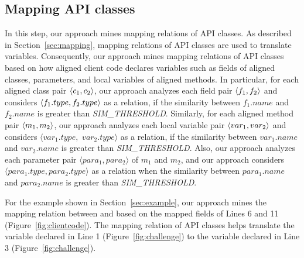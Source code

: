 \subsection{Mapping API classes}
\label{sec:approach:mappingtypes}

In this step, our approach mines mapping relations of
API classes. As described in Section~\ref{sec:mapping}, mapping relations of API classes are used
to translate variables. Consequently, our approach mines mapping
relations of API classes based on how aligned client code declares
variables such as fields of aligned classes, parameters, and local variables of aligned methods. In
particular, for each aligned class pair $\langle c_1, c_2 \rangle$, our
approach analyzes each field pair $\langle f_1, f_2 \rangle$ and considers
$\langle f_1.type, f_2.type \rangle$ as a relation, if the similarity between $f_1.name$ and $f_2.name$ is
greater than \emph{SIM\_THRESHOLD}. Similarly, for each aligned method pair
$\langle m_1, m_2 \rangle$, our approach analyzes each local variable pair
$\langle var_1, var_2 \rangle$ and considers $\langle var_1.type,$ $
var_2.type\rangle$ as a relation, if the similarity between
$var_1.name$ and $var_2.name$ is greater than
\emph{SIM\_THRESHOLD}. Also, our approach analyzes each parameter pair
$\langle para_1, para_2\rangle$ of $m_1$ and $m_2$, and our
approach considers $\langle para_1.type, para_2.type\rangle$ as
a relation when the similarity between $para_1.name$ and $para_2.name$ is greater than \emph{SIM\_THRESHOLD}.

For the example shown in Section~\ref{sec:example}, our approach
mines the mapping relation between  and
 based on the mapped fields of Lines 6
and 11 (Figure~\ref{fig:clientcode}). The mapping relation of API
classes helps translate the variable declared in Line 1
(Figure~\ref{fig:challenge}) to the variable declared in Line 3
(Figure~\ref{fig:challenge}).


